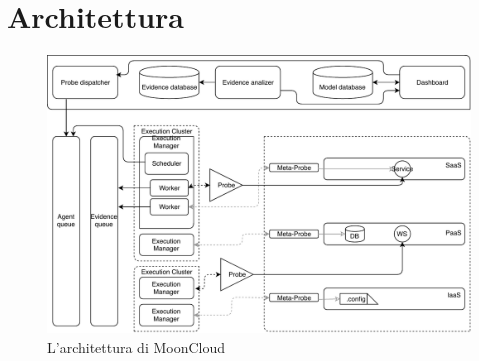\section{Architettura}\label{sec:mooncloud-archi}

\begin{figure}
	\includegraphics[scale=0.6]{img/mooncloud_archi}
	\caption{L'architettura di MoonCloud}
	\label{fig:mooncloud-archi-fig}
\end{figure}

